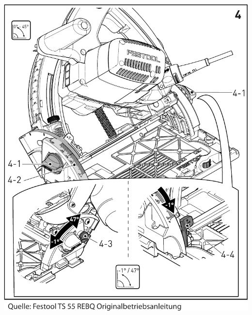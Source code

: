 \documentclass{\basedir/fablab-document}
\begin{document}
\begin{minipage}{90mm}
    \centering
	\includegraphics[width=1\textwidth]{img/festool-schnittwinkel.pdf}
	\label{fig:schnittwinkel}
\end{minipage}
\end{document}
